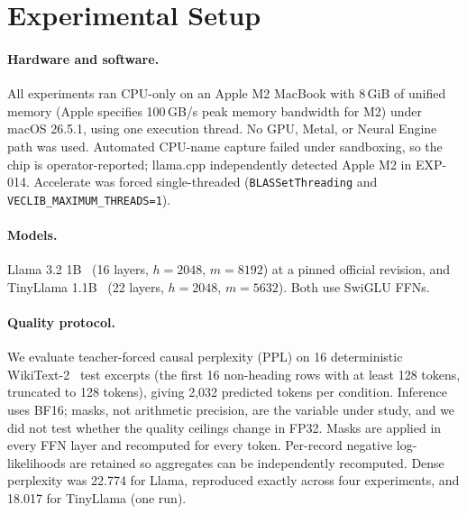 \section{Experimental Setup}

\paragraph{Hardware and software.} All experiments ran CPU-only on an Apple M2
MacBook with 8\,GiB of unified memory (Apple specifies 100\,GB/s peak memory
bandwidth for M2) under macOS 26.5.1, using one execution thread. No GPU,
Metal, or Neural Engine path was used. Automated CPU-name capture failed under
sandboxing, so the chip is operator-reported; llama.cpp independently detected
Apple M2 in EXP-014. Accelerate was forced single-threaded
(\texttt{BLASSetThreading} and \texttt{VECLIB\_MAXIMUM\_THREADS=1}).

\paragraph{Models.} Llama 3.2 1B~\cite{llama3} (16 layers, $h=2048$,
$m=8192$) at a pinned official revision, and TinyLlama
1.1B~\cite{tinyllama} (22 layers, $h=2048$, $m=5632$). Both use SwiGLU FFNs.

\paragraph{Quality protocol.} We evaluate teacher-forced causal perplexity
(PPL) on 16 deterministic WikiText-2~\cite{wikitext} test excerpts (the first
16 non-heading rows with at least 128 tokens, truncated to 128 tokens), giving
2,032 predicted tokens per condition. Inference uses BF16; masks, not
arithmetic precision, are the variable under study, and we did not test
whether the quality ceilings change in FP32. Masks are applied in every
FFN layer and recomputed for every token. Per-record negative log-likelihoods
are retained so aggregates can be independently recomputed. Dense perplexity
was 22.774 for Llama, reproduced exactly across four experiments, and 18.017
for TinyLlama (one run).

